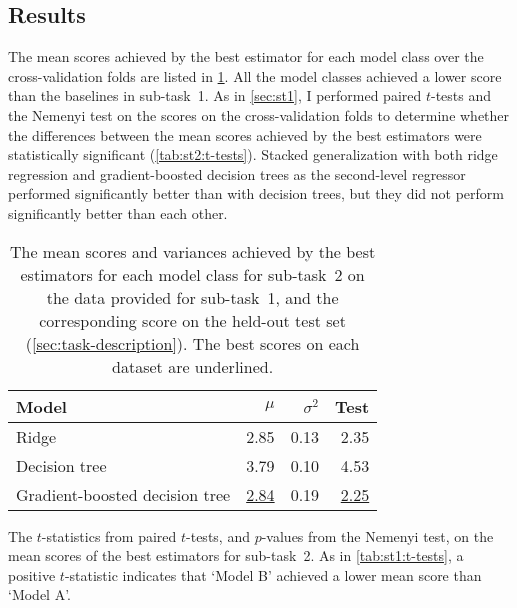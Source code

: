 \subsection{Results}
\label{sec:st2:results}

The mean scores achieved by the best estimator for each model class over the
cross-validation folds are listed in \cref{tab:st2:results}.
All the model classes achieved a lower score than the baselines in sub-task~1.
As in \cref{sec:st1}, I performed paired $t$-tests and the Nemenyi test on the scores
on the cross-validation folds to determine whether the differences between the mean
scores achieved by the best estimators were statistically significant
(\cref{tab:st2:t-tests}).
Stacked generalization with both ridge regression and gradient-boosted decision trees
as the second-level regressor performed significantly better than with decision trees,
but they did not perform significantly better than each other.

\begin{table}
  \centering
  \begin{tabular}{lrrr}
    \toprule
    Model                          & $\mu$            & $\sigma^2$ & Test
    \\
    \midrule
    Ridge                          & 2.85             & 0.13       & 2.35
    \\
    Decision tree                  & 3.79             & 0.10       & 4.53
    \\
    Gradient-boosted decision tree & \underline{2.84} & 0.19       & \underline{2.25}
    \\
    \bottomrule
  \end{tabular}
  \caption{The mean scores and variances achieved by the best estimators for each model
    class for sub-task~2 on the data provided for sub-task~1, and the corresponding score
    on the held-out test set (\cref{sec:task-description}).
    The best scores on each dataset are underlined.
  }
  \label{tab:st2:results}
\end{table}

\begin{table}
  \centering
  \caption{The $t$-statistics from paired $t$-tests, and $p$-values from the Nemenyi test, on the
    mean scores of the best estimators for sub-task~2.
    As in \cref{tab:st1:t-tests}, a positive $t$-statistic indicates that `Model B'
    achieved a lower mean score than `Model A'.
  }
  \label{tab:st2:t-tests}
\end{table}

